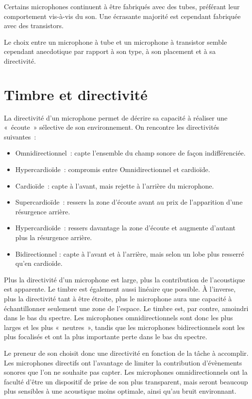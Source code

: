 \documentclass[
]{book}
\providecommand{\tightlist}{%
  \setlength{\itemsep}{0pt}\setlength{\parskip}{0pt}}
\begin{document}
Certains microphones continuent à être fabriqués avec des tubes, préférant leur comportement vis-à-vis du son. Une écrasante majorité est cependant fabriquée avec des transistors.

Le choix entre un microphone à tube et un microphone à transistor semble cependant anecdotique par rapport à son type, à son placement et à sa directivité.

\hypertarget{timbre-et-directivituxe9}{%
\section{Timbre et directivité}\label{timbre-et-directivituxe9}}

La directivité d'un microphone permet de décrire sa capacité à réaliser une «~écoute~» sélective de son environnement. On rencontre les directivités suivantes~:

\begin{itemize}
\tightlist
\item
  Omnidirectionnel~: capte l'ensemble du champ sonore de façon indifférenciée.
\item
  Hypercardioïde~: compromis entre Omnidirectionnel et cardioïde.
\item
  Cardioïde~: capte à l'avant, mais rejette à l'arrière du microphone.
\item
  Supercardioïde~: ressers la zone d'écoute avant au prix de l'apparition d'une résurgence arrière.
\item
  Hypercardioïde~: ressers davantage la zone d'écoute et augmente d'autant plus la résurgence arrière.
\item
  Bidirectionnel : capte à l'avant et à l'arrière, mais selon un lobe plus resserré qu'en cardioïde.
\end{itemize}

Plus la directivité d'un microphone est large, plus la contribution de l'acoustique est apparente. Le timbre est également aussi linéaire que possible. À l'inverse, plus la directivité tant à être étroite, plus le microphone aura une capacité à échantillonner seulement une zone de l'espace. Le timbre est, par contre, amoindri dans le bas du spectre. Les microphones omnidirectionnels sont donc les plus larges et les plus «~neutres~», tandis que les microphones bidirectionnels sont les plus focalisés et ont la plus importante perte dans le bas du spectre.

Le preneur de son choisit donc une directivité en fonction de la tâche à accomplir. Les microphones directifs ont l'avantage de limiter la contribution d'évènements sonores que l'on ne souhaite pas capter. Les microphones omnidirectionnels ont la faculté d'être un dispositif de prise de son plus transparent, mais seront beaucoup plus sensibles à une acoustique moins optimale, ainsi qu'au bruit environnant.
\end{document}
